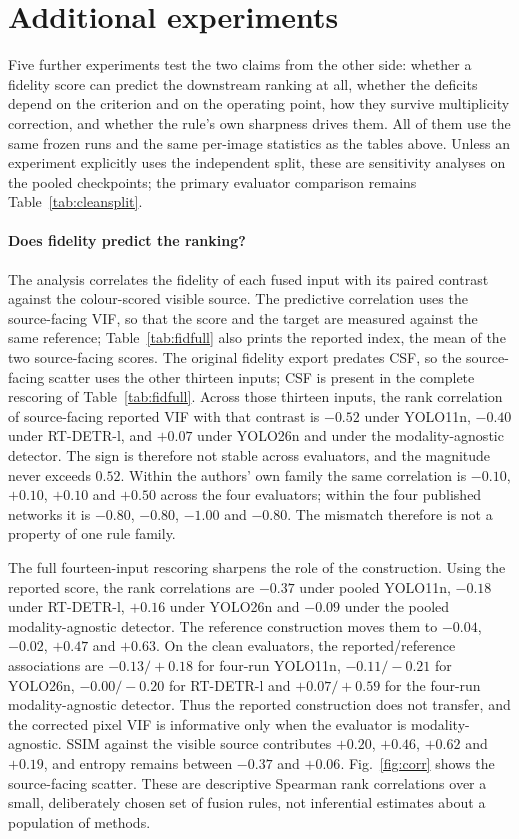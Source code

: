 \documentclass[preprint,10pt]{elsarticle}
\begin{document}
\section{Additional experiments}
\label{sec:extra}

\begin{sloppypar}
Five further experiments test the two claims from the other side: whether a fidelity
score can predict the downstream ranking at all, whether the deficits depend on the
criterion and on the operating point, how they survive multiplicity correction, and
whether the rule's own sharpness drives them. All of them use the same frozen runs and
the same per-image statistics as the tables above. Unless an experiment explicitly
uses the independent split, these are sensitivity analyses on the pooled checkpoints;
the primary evaluator comparison remains Table~\ref{tab:cleansplit}.

\paragraph{Does fidelity predict the ranking?} The analysis correlates the fidelity of
each fused input with its paired contrast against the colour-scored visible
source. The predictive correlation uses the source-facing VIF, so that the score and the
target are measured against the same reference; Table~\ref{tab:fidfull} also prints the
reported index, the mean of the two source-facing scores. The original fidelity export
predates CSF, so the source-facing scatter uses the other thirteen inputs; CSF is present
in the complete rescoring of Table~\ref{tab:fidfull}. Across those thirteen inputs, the
rank correlation of source-facing reported VIF with that contrast is
$-0.52$ under YOLO11n, $-0.40$ under RT-DETR-l, and $+0.07$ under YOLO26n and under the
modality-agnostic detector. The sign is therefore not stable across evaluators, and the
magnitude never exceeds $0.52$. Within the authors' own family the same correlation is
$-0.10$, $+0.10$, $+0.10$ and $+0.50$ across the four evaluators; within the four
published networks it is $-0.80$, $-0.80$, $-1.00$ and $-0.80$. The mismatch therefore
is not a property of one rule family.

The full fourteen-input rescoring sharpens the role of the construction. Using the
reported score, the rank correlations are $-0.37$ under pooled YOLO11n, $-0.18$ under
RT-DETR-l, $+0.16$ under YOLO26n and $-0.09$ under the pooled modality-agnostic detector.
The reference construction moves them to $-0.04$, $-0.02$, $+0.47$ and $+0.63$. On the
clean evaluators, the reported/reference associations are $-0.13/+0.18$ for four-run
YOLO11n, $-0.11/-0.21$ for YOLO26n, $-0.00/-0.20$ for RT-DETR-l and $+0.07/+0.59$
for the four-run modality-agnostic detector. Thus the reported construction does not
transfer, and the corrected pixel VIF is informative only when the evaluator is
modality-agnostic. SSIM against the visible
source contributes $+0.20$, $+0.46$, $+0.62$ and $+0.19$, and entropy remains between
$-0.37$ and $+0.06$. Fig.~\ref{fig:corr} shows the source-facing scatter.
These are descriptive Spearman rank correlations over a small, deliberately chosen set
of fusion rules, not inferential estimates about a population of methods.


\end{sloppypar}
\end{document}
